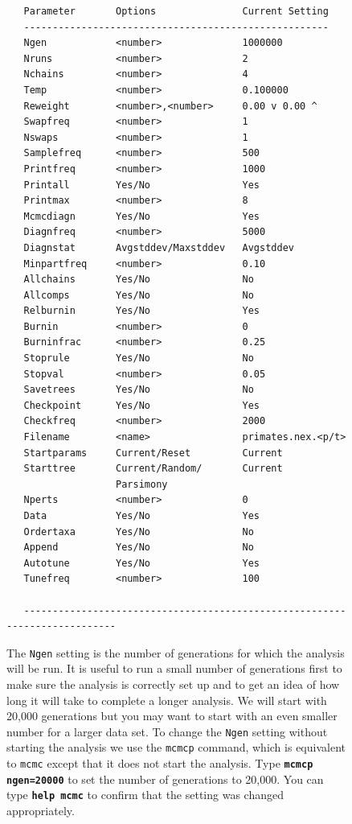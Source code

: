 \documentclass[12pt]{book}
\newcommand{\ttt}[1]{\texttt{#1}}
\newcommand{\tb}[1]{\ttt{\textbf{#1}}}
\begin{document}
\begin{figure}[h]
\begin{singlespacing}
\footnotesize
\begin{verbatim}
   Parameter       Options               Current Setting
   -----------------------------------------------------
   Ngen            <number>              1000000
   Nruns           <number>              2
   Nchains         <number>              4
   Temp            <number>              0.100000
   Reweight        <number>,<number>     0.00 v 0.00 ^
   Swapfreq        <number>              1
   Nswaps          <number>              1
   Samplefreq      <number>              500
   Printfreq       <number>              1000
   Printall        Yes/No                Yes
   Printmax        <number>              8
   Mcmcdiagn       Yes/No                Yes
   Diagnfreq       <number>              5000
   Diagnstat       Avgstddev/Maxstddev   Avgstddev
   Minpartfreq     <number>              0.10
   Allchains       Yes/No                No
   Allcomps        Yes/No                No
   Relburnin       Yes/No                Yes
   Burnin          <number>              0
   Burninfrac      <number>              0.25
   Stoprule        Yes/No                No
   Stopval         <number>              0.05
   Savetrees       Yes/No                No
   Checkpoint      Yes/No                Yes
   Checkfreq       <number>              2000
   Filename        <name>                primates.nex.<p/t>
   Startparams     Current/Reset         Current
   Starttree       Current/Random/       Current
                   Parsimony
   Nperts          <number>              0
   Data            Yes/No                Yes
   Ordertaxa       Yes/No                No
   Append          Yes/No                No
   Autotune        Yes/No                Yes
   Tunefreq        <number>              100

   ---------------------------------------------------------------------------
\end{verbatim}
\normalsize
\end{singlespacing}

The \ttt{Ngen} setting is the number of generations for which the analysis will be run. It is
useful to run a small number of generations first to make sure the analysis is correctly set up and
to get an idea of how long it will take to complete a longer analysis. We will start with 20,000
generations but you may want to start with an even smaller number for a larger data set. To change
the \ttt{Ngen} setting without starting the analysis we use the \ttt{mcmcp} command, which is
equivalent to \ttt{mcmc} except that it does not start the analysis. Type \tb{mcmcp ngen=20000} to
set the number of generations to 20,000. You can type \tb{help mcmc} to confirm that the setting
was changed appropriately.


\end{figure}
\end{document}
